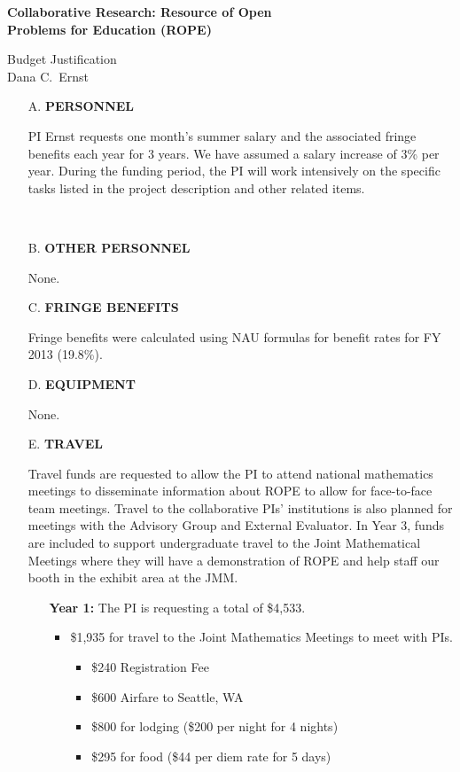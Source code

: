 \documentclass[11pt]{article}
\begin{document}
\begin{center}
{\Large \textbf{Collaborative Research: Resource of Open\\
Problems for Education (ROPE)}}

\bigskip

{\Large Budget Justification}\\
\smallskip
Dana C.~Ernst
\end{center}

\begin{enumerate}[leftmargin=*]

\item[A.] \textbf{PERSONNEL}

PI Ernst requests one month's summer salary and the associated fringe benefits each year for 3 years. We have assumed a salary increase of 3\% per year.  During the funding period, the PI will work intensively on the specific tasks listed in the project description and other related items. 

\ \hfill {}

\item[B.] \textbf{OTHER PERSONNEL}

None. \hfill {}

\item[C.] \textbf{FRINGE BENEFITS}

Fringe benefits were calculated using NAU formulas for benefit rates for FY 2013 (19.8\%).

\hfill {}

\item[D.] \textbf{EQUIPMENT}

None. \hfill {}

\item[E.] \textbf{TRAVEL}

Travel funds are requested to allow the PI to attend national mathematics meetings to disseminate information about ROPE to allow for face-to-face team meetings.  Travel to the collaborative PIs' institutions is also planned for meetings with the Advisory Group and External Evaluator. In Year 3, funds are included to support undergraduate travel to the Joint Mathematical Meetings where they will have a demonstration of ROPE and help staff our booth in the exhibit area at the JMM.

\begin{enumerate}
\item[] \textbf{Year 1:} The PI is requesting a total of \$4,533.
\begin{itemize}
\item \$1,935 for travel to the Joint Mathematics Meetings to meet with PIs.
\begin{itemize}
\item \$240 Registration Fee
\item \$600 Airfare to Seattle, WA
\item \$800 for lodging (\$200 per night for 4 nights)
\item \$295 for food (\$44 per diem rate for 5 days)
\end{itemize}


\end{itemize}
\end{enumerate}
\end{enumerate}
\end{document}
